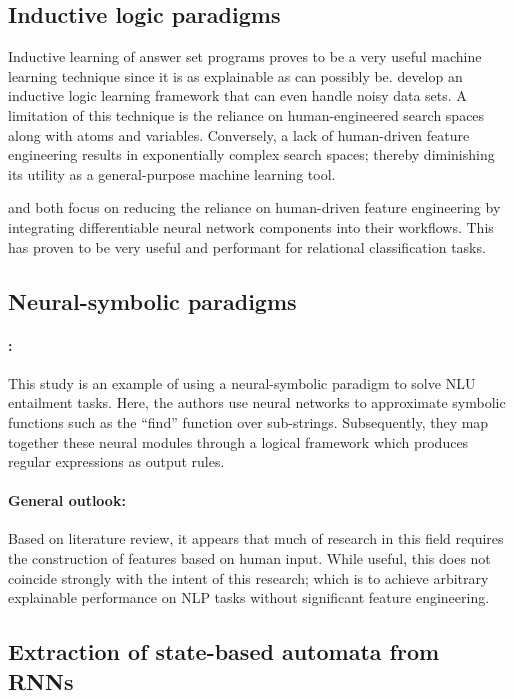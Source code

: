 \subsection{Inductive logic paradigms}

Inductive learning of answer set programs proves to be a very useful machine learning technique since it is as explainable as can possibly be. \citet{law2015ilasp} develop an inductive logic learning framework that can even handle noisy data sets. A limitation of this technique is the reliance on human-engineered search spaces along with atoms and variables. Conversely, a lack of human-driven feature engineering results in exponentially complex search spaces; thereby diminishing its utility as a general-purpose machine learning tool.

\citet{evans2018learning} and \citet{DBLP:journals/corr/abs-1906-03523} both focus on reducing the reliance on human-driven feature engineering by integrating differentiable neural network components into their workflows. This has proven to be very useful and performant for relational classification tasks.

\subsection{Neural-symbolic paradigms}

\paragraph{\citealt{li2018generalize}:} This study is an example of using a neural-symbolic paradigm to solve NLU entailment tasks. Here, the authors use neural networks to approximate symbolic functions such as the ``find'' function over sub-strings. Subsequently, they map together these neural modules through a logical framework which produces regular expressions as output rules.

\paragraph{General outlook:} Based on literature review, it appears that much of research in this field requires the construction of features based on human input. While useful, this does not coincide strongly with the intent of this research; which is to achieve arbitrary explainable performance on NLP tasks without significant feature engineering.

\subsection{Extraction of state-based automata from RNNs}

